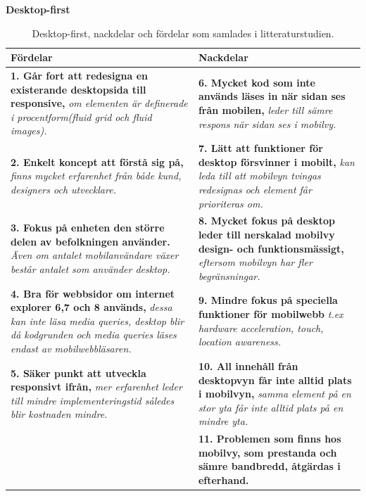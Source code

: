 \documentclass[11pt]{article}
\begin{document}
\textbf{Desktop-first}
\begin{table}[H]
\centering
\begin{tabular}{|p{7.2cm}|p{7.2cm}|}
\hline
Fördelar&Nackdelar\\ \hline
\textbf{1. Går fort att redesigna en existerande desktopsida till responsive, }\textit{om elementen är definerade i procentform(fluid grid och fluid images).}&\textbf{6. Mycket kod som inte används läses in när sidan ses från mobilen, }\textit{leder till sämre respons när sidan ses i mobilvy.}\\ \hline
\textbf{2. Enkelt koncept att förstå sig på, }\textit{finns mycket erfarenhet från både kund, designers och utvecklare.}& \textbf{7. Lätt att funktioner för desktop försvinner i mobilt,} \textit{kan leda till att mobilvyn tvingas redesignas och element får prioriteras om.} \\ \hline
\textbf{3. Fokus på enheten den större delen av befolkningen använder. }\textit{Även om antalet mobilanvändare växer består antalet som använder desktop.}&\textbf{8. Mycket fokus på desktop leder till nerskalad mobilvy design- och funktionsmässigt, }\textit{eftersom mobilvyn har fler begränsningar.}\\ \hline
\textbf{4. Bra för webbsidor om internet explorer 6,7 och 8 används, }\textit{dessa kan inte läsa media queries, desktop blir då kodgrunden och media queries läses endast av mobilwebbläsaren.}&  \textbf{9. Mindre fokus  på speciella funktioner för mobilwebb} \textit{t.ex hardware acceleration, touch, location awareness.} \\ \hline
\textbf{5. Säker punkt att utveckla responsivt ifrån, }\textit{mer erfarenhet leder till mindre implementeringstid således blir kostnaden mindre.}&\textbf{10. All innehåll från desktopvyn får inte alltid plats i mobilvyn,} \textit{samma element på en stor yta får inte alltid plats på en mindre yta.}\\ \hline
~&\textbf{11. Problemen som finns hos mobilvy, som prestanda och sämre bandbredd, åtgärdas i efterhand.}\\ \hline


    \end{tabular}
    \caption {Desktop-first, nackdelar och fördelar som samlades i litteraturstudien.}
\end{table}
\end{document}
